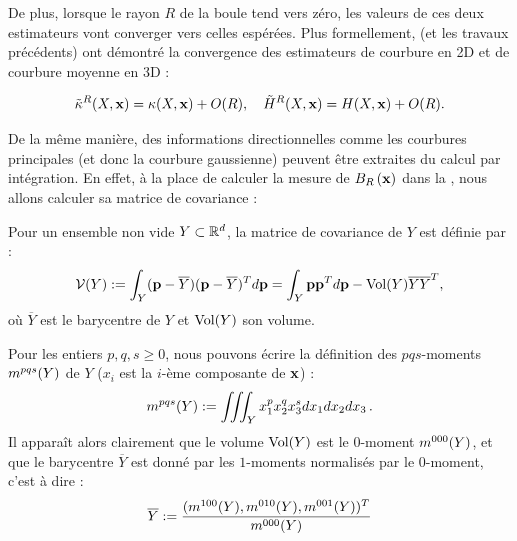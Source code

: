 %
De plus, lorsque le rayon $R$ de la boule tend vers zéro, les valeurs de ces
deux estimateurs vont converger vers celles espérées. Plus formellement,
 (et les travaux précédents) ont démontré la
convergence des estimateurs de courbure en 2D et de courbure moyenne en 3D :
%
\begin{theorem}{}
  \label{theo:pottmann-2d-3d-mean-conv}
  \begin{equation}
    \tilde{\kappa}^{R}(X,\mathbf{x}) = \kappa(X,\mathbf{x}) + O(R),
    \quad\tilde{H}^{R}(X,\mathbf{x}) = H(X,\mathbf{x}) + O(R).
  \end{equation}
\end{theorem}
%
De la même manière, des informations directionnelles comme les courbures
principales (et donc la courbure gaussienne) peuvent être extraites du calcul
par intégration. En effet, à la place de calculer la mesure de $B_{R}\left(\mathbf{x}\right)$
dans la , nous allons calculer sa matrice
de covariance :
%
\begin{definition}
  \label{def:cov-matrix}
  Pour un ensemble non vide $Y \subset \mathbb{R}^d$, la matrice de covariance de $Y$
  est définie par :
  \begin{equation}
    \mathcal{V}(Y) := \int_Y (\mathbf{p}-\overline{Y})(\mathbf{p}-\overline{Y})^T d\mathbf{p} = \int_Y \mathbf{p} \mathbf{p}^T d\mathbf{p} - \mathrm{Vol}(Y)\overline{Y}\overline{Y}^T,
  \end{equation}
  où $\overline{Y}$ est le barycentre de $Y$ et $\mathrm{Vol}(Y)$ son volume.
\end{definition}
%
Pour les entiers $p, q, s \ge 0$, nous pouvons écrire la définition des $
pqs$-moments $m^{pqs}(Y)$ de $Y$ ($x_i$ est la $i$-ème composante de $\mathbf{x}$) :
%
\begin{equation}
  \label{eq:moments}
  m^{pqs}(Y) := \iiint_Y x_1^p x_2^q x_3^s dx_1 dx_2 dx_3\,.
\end{equation}
%
Il apparaît alors clairement que le volume $\mathrm{Vol}(Y)$ est le $0$-moment
$m^{000}(Y)$, et que le barycentre $\overline{Y}$ est donné par les $1$-moments
normalisés par le $0$-moment, c'est à dire :
%
\begin{equation}
  \overline{Y} := \frac{( m^{100}(Y), m^{010}(Y), m^{001}(Y) )^T}{m^{000}(Y)}
\end{equation}

